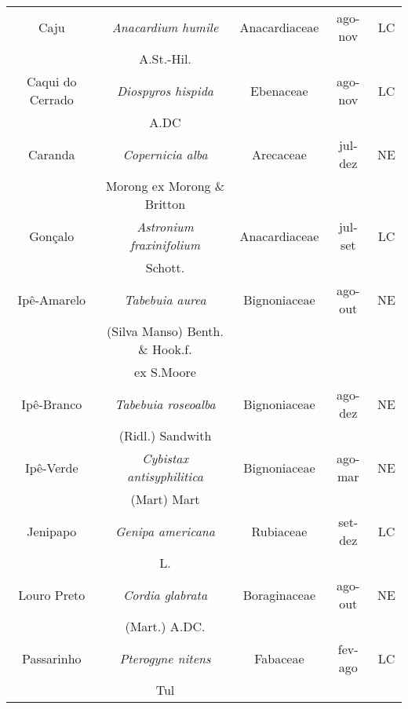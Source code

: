 \begin{anexosenv}
\begin{table}[h]
\begin{tabular}{ccccc}
		Caju 			 & \textit{Anacardium humile}  	    		& Anacardiaceae & ago-nov 			& LC 				\\
		&  A.St.-Hil.					    		&				&			    	&					\\
		
		Caqui do Cerrado & \textit{Diospyros hispida}  	    		& Ebenaceae 	& ago-nov 			& LC 				\\
		&  A.DC						    		&				&				   	&					\\
		
		Caranda 		 & \textit{Copernicia alba}  	    		& Arecaceae 	& jul-dez 			& NE 				\\
		& Morong ex Morong \& Britton	    		&				&					&					\\
		
		Gonçalo 		 & \textit{Astronium fraxinifolium}			& Anacardiaceae & jul-set 			& LC 				\\
		&  Schott.									&				&				    &					\\
		
		Ipê-Amarelo		 & \textit{Tabebuia aurea}   				& Bignoniaceae 	& ago-out 			& NE 				\\
		& (Silva Manso) Benth. \&	Hook.f.			&				&				    &					\\
		& ex S.Moore								&				&				    &					\\
		
		Ipê-Branco 		 & \textit{Tabebuia roseoalba}  			& Bignoniaceae 	& ago-dez			& NE 				\\
		& (Ridl.) Sandwith 						&				&				    &					\\
		
		Ipê-Verde 		 & \textit{Cybistax antisyphilitica}		& Bignoniaceae  & ago-mar 			& NE 				\\
		& (Mart) Mart 								&				&				    &					\\
		
		Jenipapo 		 & \textit{Genipa americana}  				& Rubiaceae 	& set-dez 			& LC 				\\
		& L. 										&				&				    &					\\
		
		Louro Preto 	 & \textit{Cordia glabrata}  				& Boraginaceae 	& ago-out 			& NE 				\\
		& (Mart.) A.DC. 							&				&				    &					\\
		
		Passarinho 		 & \textit{Pterogyne nitens}  				& Fabaceae 		& fev-ago 			& LC 				\\
		& Tul										&				&				    &					\\
		

\end{tabular}
\end{table}
\end{anexosenv}
